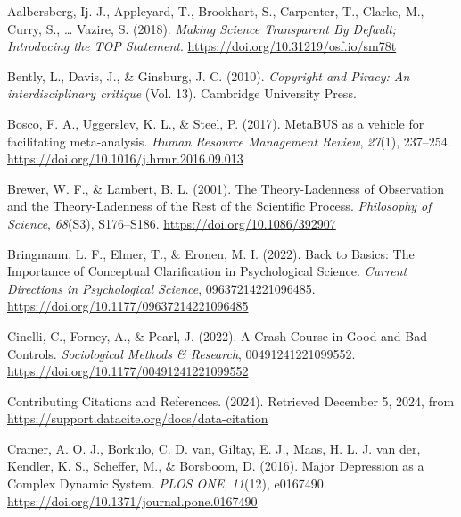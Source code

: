 \documentclass[
  man, noextraspace,floatsintext]{apa6}
\newlength{\cslhangindent}
\newenvironment{CSLReferences}[2] %
 {\begin{list}{}{%
  \setlength{\itemindent}{0pt}
  \setlength{\leftmargin}{0pt}
  \setlength{\parsep}{0pt}
  \ifodd #1
   \setlength{\leftmargin}{\cslhangindent}
   \setlength{\itemindent}{-1\cslhangindent}
  \fi
  \setlength{\itemsep}{#2\baselineskip}}}
 {\end{list}}
\begin{document}
\label{refs}
\begin{CSLReferences}{1}{0}
Aalbersberg, Ij. J., Appleyard, T., Brookhart, S., Carpenter, T., Clarke, M., Curry, S., \ldots{} Vazire, S. (2018). \emph{Making {Science Transparent By Default}; {Introducing} the {TOP Statement}}. \url{https://doi.org/10.31219/osf.io/sm78t}

Bently, L., Davis, J., \& Ginsburg, J. C. (2010). \emph{Copyright and {Piracy}: {An} interdisciplinary critique} (Vol. 13). Cambridge University Press.

Bosco, F. A., Uggerslev, K. L., \& Steel, P. (2017). {MetaBUS} as a vehicle for facilitating meta-analysis. \emph{Human Resource Management Review}, \emph{27}(1), 237--254. \url{https://doi.org/10.1016/j.hrmr.2016.09.013}

Brewer, W. F., \& Lambert, B. L. (2001). The {Theory-Ladenness} of {Observation} and the {Theory-Ladenness} of the {Rest} of the {Scientific Process}. \emph{Philosophy of Science}, \emph{68}(S3), S176--S186. \url{https://doi.org/10.1086/392907}

Bringmann, L. F., Elmer, T., \& Eronen, M. I. (2022). Back to {Basics}: {The Importance} of {Conceptual Clarification} in {Psychological Science}. \emph{Current Directions in Psychological Science}, 09637214221096485. \url{https://doi.org/10.1177/09637214221096485}

Cinelli, C., Forney, A., \& Pearl, J. (2022). A {Crash Course} in {Good} and {Bad Controls}. \emph{Sociological Methods \& Research}, 00491241221099552. \url{https://doi.org/10.1177/00491241221099552}

Contributing {Citations} and {References}. (2024). Retrieved December 5, 2024, from \url{https://support.datacite.org/docs/data-citation}

Cramer, A. O. J., Borkulo, C. D. van, Giltay, E. J., Maas, H. L. J. van der, Kendler, K. S., Scheffer, M., \& Borsboom, D. (2016). Major {Depression} as a {Complex Dynamic System}. \emph{PLOS ONE}, \emph{11}(12), e0167490. \url{https://doi.org/10.1371/journal.pone.0167490}


\end{CSLReferences}
\end{document}
